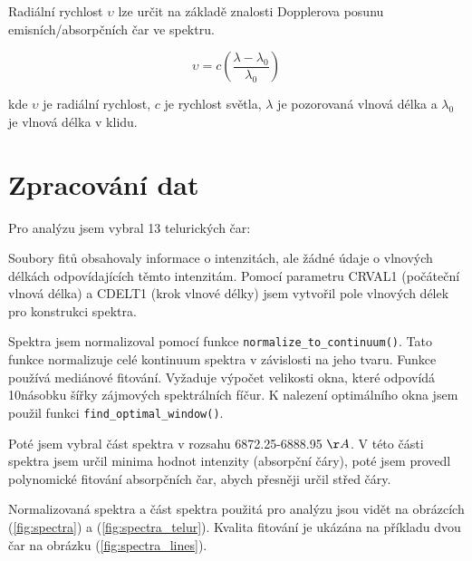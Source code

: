 \documentclass[a4paper,11pt,twocolumn]{article}
\begin{document}
        Radiální rychlost $\upsilon$ lze určit na základě znalosti Dopplerova posunu emisních/absorpčních čar ve spektru. 

        \begin{equation}
            \upsilon = c \left( \frac{\lambda - \lambda_0}{\lambda_0} \right) 
        \end{equation}

        kde $\upsilon$ je radiální rychlost, $c$ je rychlost světla, $\lambda$ je pozorovaná vlnová délka a $\lambda_0$ je vlnová délka v klidu.
        
    \section{Zpracování dat}
        Pro analýzu jsem vybral 13 telurických čar:


        \vspace{10pt}

        Soubory fitů obsahovaly informace o intenzitách, ale žádné údaje o vlnových délkách odpovídajících těmto intenzitám. Pomocí parametru CRVAL1 (počáteční vlnová délka) a CDELT1 (krok vlnové délky) jsem vytvořil pole vlnových délek pro konstrukci spektra. 

        Spektra jsem normalizoval pomocí funkce \texttt{normalize\_to\_continuum()}. Tato funkce normalizuje celé kontinuum spektra v závislosti na jeho tvaru. Funkce používá mediánové fitování. Vyžaduje výpočet velikosti okna, které odpovídá 10násobku šířky zájmových spektrálních fíčur. K nalezení optimálního okna jsem použil funkci \texttt{find\_optimal\_window()}. 
        
        Poté jsem vybral část spektra v rozsahu 6872.25-6888.95 $\AA$. V této části spektra jsem určil minima hodnot intenzity (absorpční čáry), poté jsem provedl polynomické fitování absorpčních čar, abych přesněji určil střed čáry. 

        Normalizovaná spektra a část spektra použitá pro analýzu jsou vidět na obrázcích (\ref{fig:spectra}) a (\ref{fig:spectra_telur}). Kvalita fitování je ukázána na příkladu dvou čar na obrázku (\ref{fig:spectra_lines}).
\end{document}
